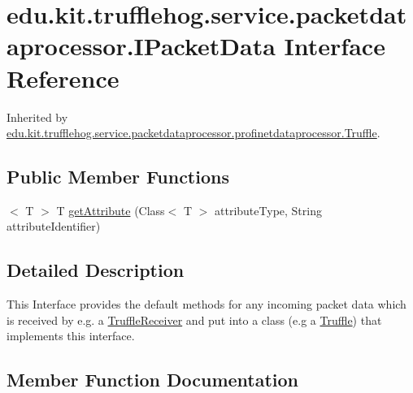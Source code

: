 \hypertarget{interfaceedu_1_1kit_1_1trufflehog_1_1service_1_1packetdataprocessor_1_1_i_packet_data}{}\section{edu.\+kit.\+trufflehog.\+service.\+packetdataprocessor.\+I\+Packet\+Data Interface Reference}
\label{interfaceedu_1_1kit_1_1trufflehog_1_1service_1_1packetdataprocessor_1_1_i_packet_data}


Inherited by \hyperlink{classedu_1_1kit_1_1trufflehog_1_1service_1_1packetdataprocessor_1_1profinetdataprocessor_1_1_truffle}{edu.\+kit.\+trufflehog.\+service.\+packetdataprocessor.\+profinetdataprocessor.\+Truffle}.

\subsection*{Public Member Functions}
\begin{DoxyCompactItemize}
\item 
$<$ T $>$ T \hyperlink{interfaceedu_1_1kit_1_1trufflehog_1_1service_1_1packetdataprocessor_1_1_i_packet_data_ac86d23f76548a696f5403a354d85ee5f}{get\+Attribute} (Class$<$ T $>$ attribute\+Type, String attribute\+Identifier)
\end{DoxyCompactItemize}


\subsection{Detailed Description}
This Interface provides the default methods for any incoming packet data which is received by e.\+g. a \hyperlink{}{Truffle\+Receiver} and put into a class (e.\+g a \hyperlink{}{Truffle}) that implements this interface. 

\subsection{Member Function Documentation}
\hypertarget{interfaceedu_1_1kit_1_1trufflehog_1_1service_1_1packetdataprocessor_1_1_i_packet_data_ac86d23f76548a696f5403a354d85ee5f}{}
